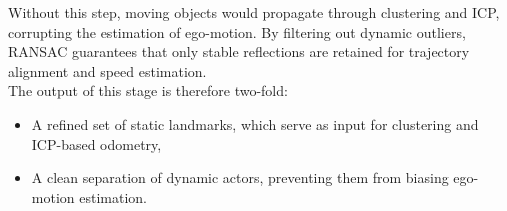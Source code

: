Without this step, moving objects would propagate through clustering and ICP, corrupting the estimation of ego-motion.  
By filtering out dynamic outliers, RANSAC guarantees that only stable reflections are retained for trajectory alignment and speed estimation.  
\vspace{2.0em}
\\
The output of this stage is therefore two-fold:
\begin{itemize}
    \item A refined set of static landmarks, which serve as input for clustering and ICP-based odometry,
    \item A clean separation of dynamic actors, preventing them from biasing ego-motion estimation.
\end{itemize}
